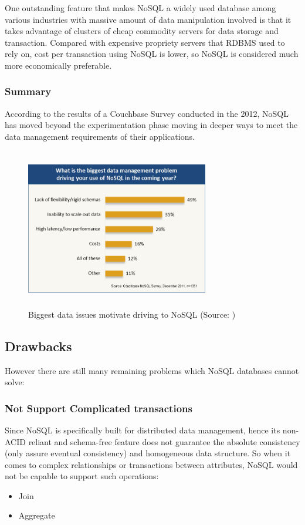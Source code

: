 One outstanding feature that makes NoSQL a widely used database among various industries with massive amount of data manipulation involved is that it takes advantage of clusters of cheap commodity servers for data storage and transaction.
Compared with expensive propriety servers that RDBMS used to rely on, cost per transaction using NoSQL is lower, so NoSQL is considered much more economically preferable.  


\subsubsection{Summary}\mbox{}

According to the results of a Couchbase Survey conducted in the 2012,  NoSQL has moved beyond the experimentation phase moving in deeper ways to meet the data management requirements of their applications\cite{drive}.

\begin{figure}[H]
	\includegraphics[height=7cm, width=8cm]{../../images/drive.png}
	\caption{Biggest data issues motivate driving to NoSQL (Source: \cite{drive})}
\end{figure}

\subsection{Drawbacks}

However there are still many remaining problems which NoSQL
databases cannot solve:

\subsubsection{Not Support Complicated transactions}\mbox{}

Since NoSQL is specifically built for distributed data management, hence its non-ACID reliant  and schema-free  feature  does not guarantee the absolute consistency (only assure eventual consistency) and homogeneous data structure. So when it comes to complex relationships or transactions between attributes, NoSQL would not be capable to support such operations:
\begin{itemize}
	\item Join
	\item Aggregate
\end{itemize}

